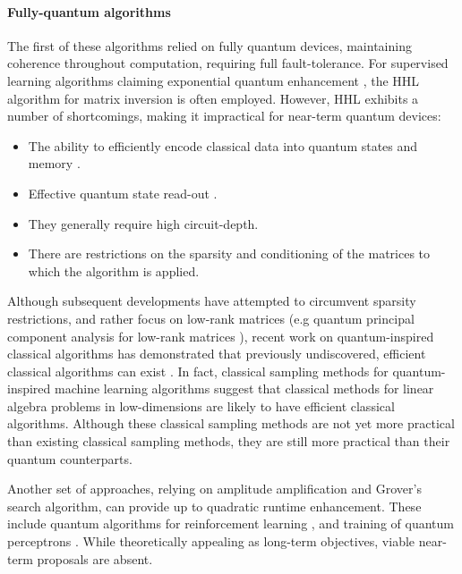 \paragraph{Fully-quantum algorithms}

The first of these algorithms relied on fully quantum devices, maintaining coherence throughout computation, requiring full fault-tolerance. For supervised learning algorithms claiming exponential quantum enhancement \cite{bib:biamonte2017quantum, bib:ciliberto2018quantum}, the HHL algorithm \cite{bib:harrow2009quantum} for matrix inversion is often employed. However, HHL exhibits a number of shortcomings, making it impractical for near-term quantum devices:
\begin{itemize}
\item The ability to efficiently encode classical data into quantum states and memory \cite{bib:aaronson2015read}.
\item Effective quantum state read-out \cite{bib:aaronson2015read}.
\item They generally require high circuit-depth.
\item There are restrictions on the sparsity and conditioning of the matrices to which the algorithm is applied.
\end{itemize}

Although subsequent developments have attempted to circumvent sparsity restrictions, and rather focus on low-rank matrices (e.g quantum principal component analysis for low-rank matrices \cite{bib:lloyd2014quantum}), recent work on quantum-inspired classical algorithms has demonstrated that previously undiscovered, efficient classical algorithms can exist \cite{bib:tang2018quantum, bib:gilyen2018quantum, bib:chia2018quantum}. In fact, classical sampling methods \cite{bib:tang2018quantum} for quantum-inspired machine learning algorithms suggest that classical methods for linear algebra problems in low-dimensions are likely to have efficient classical algorithms. Although these classical sampling methods are not yet more practical than existing classical sampling methods, they are still more practical than their quantum counterparts.

Another set of approaches, relying on amplitude amplification and Grover's search algorithm, can provide up to quadratic runtime enhancement. These include quantum algorithms for reinforcement learning \cite{bib:dunjko2016quantum}, and training of quantum perceptrons \cite{bib:kapoor2016quantum}. While theoretically appealing as long-term objectives, viable near-term proposals are absent.

